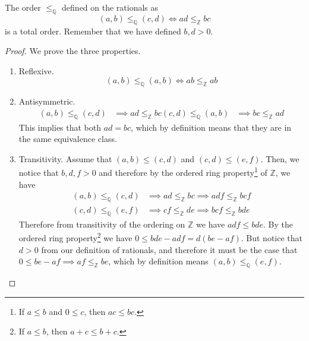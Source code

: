     \begin{theorem}
      The order $\leq_{\mathbb{Q}}$ defined on the rationals as 
      \begin{equation}
        (a, b) \leq_{\mathbb{Q}} (c, d) \iff ad \leq_{\mathbb{Z}} bc
      \end{equation}
      is a total order. Remember that we have defined $b, d > 0$. 
    \end{theorem}
    \begin{proof}
      We prove the three properties. 
      \begin{enumerate}
        \item Reflexive. 
        \begin{equation}
          (a, b) \leq_{\mathbb{Q}} (a, b) \iff ab \leq_{\mathbb{Z}} ab
        \end{equation} 

        \item Antisymmetric. 
        \begin{align}
          (a, b) \leq_{\mathbb{Q}} (c, d) & \implies ad \leq_{\mathbb{Z}} bc
          (c, d) \leq_{\mathbb{Q}} (a, b) & \implies bc \leq_{\mathbb{Z}} ad
        \end{align} 
        This implies that both $ad = bc$, which by definition means that they are in the same equivalence class. 

        \item Transitivity. Assume that $(a, b) \leq (c, d)$ and $(c, d) \leq (e, f)$. Then, we notice that $b, d, f > 0$ and therefore by the ordered ring property\footnote{If $a \leq b$ and $0 \leq c$, then $ac \leq bc$.} of $\mathbb{Z}$, we have 
        \begin{align}
          (a, b) \leq_{\mathbb{Q}} (c, d) & \implies ad \leq_{\mathbb{Z}} bc \implies adf \leq_{\mathbb{Z}} bcf \\ 
          (c, d) \leq_{\mathbb{Q}} (e, f) & \implies cf \leq_{\mathbb{Z}} de \implies bcf \leq_{\mathbb{Z}} bde
        \end{align}
        Therefore from transitivity of the ordering on $\mathbb{Z}$ we have $adf \leq bde$. By the ordered ring property\footnote{If $a \leq b$, then $a + c \leq b + c$.}  we have $0 \leq bde - adf = d(be - af)$. But notice that $d > 0$ from our definition of rationals, and therefore it must be the case that $0 \leq be - af \implies af \leq_{\mathbb{Z}} be$, which by definition means $(a, b) \leq_{\mathbb{Q}} (e, f)$. 
      \end{enumerate}
    \end{proof} 

